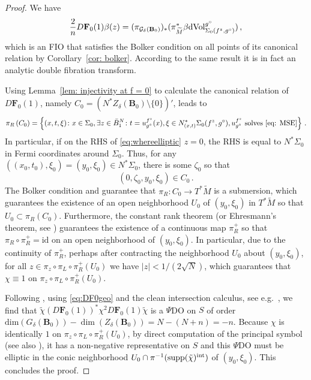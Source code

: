 \documentclass[11pt]{amsart}
\theoremstyle{definition}
\numberwithin{equation}{section}
\newcommand{\abs}[1]{\lvert #1 \rvert}          %
\newcommand{\supp}{\mathrm{supp}}
\newcommand{\BB}{\mathbf B}
\begin{document}
\begin{proof}
	We have
	\begin{equation}\label{eq:DF0geo}
		\frac{2}{n} D\mathbf{F}_0(1)\beta(z) = (\pi_{\mathcal{G}_\delta(\BB_0)})_\ast(\pi_{\widetilde{M}}^\ast \beta {\rm d Vol}_{\Sigma_0(f^z,g^\circ)}^{g^\circ})\,,
	\end{equation}
	which is an FIO that satisfies the Bolker condition on all points of its canonical relation by Corollary~\ref{cor: bolker}. According to the same result it is in fact an analytic double fibration transform.

	Using Lemma~\ref{lem: injectivity at f = 0} to calculate the canonical relation of $D\mathbf{F}_0(1)$, namely $C_0 = (N^\ast Z_\delta(\BB_0)\setminus\{0\})'$, leads to 
	\begin{equation}\label{eq:whereelliptic}
		\pi_R \left(C_0\right) = \left\{(x,t,\xi) \colon x\in{\Sigma}_0,  \exists z \in \bar{B}_1^{N}\colon t=u_{g^\circ}^{f^z}(x), \xi \in N^\ast_{(x,t)}\Sigma_0(f^z,g^\circ), u_{g^\circ}^{f^z}\ \text{solves}\ \eqref{eq: MSE} \right\}\,.
	\end{equation}
	In particular, if on the RHS of \eqref{eq:whereelliptic} $z=0$, the RHS is equal to $N^\ast \Sigma_0$ in Fermi coordinates around $\Sigma_0$. Thus, for any $((x_0,t_0),\xi_0)= (y_0,\xi_0) \in N^\ast \Sigma_0$, there is some $\zeta_0$ so that 
	\[
		(0,\zeta_0,y_0,\xi_0) \in C_0\,.
	\]
	The Bolker condition and \cite[Lem.~4.3]{zbMATH01860565} guarantee that $\pi_R \colon C_0 \to T^\ast \widetilde{M}$ is a submersion, which guarantees the existence of an open neighborhood $U_0$ of $(y_0,\xi_0)$ in $T^\ast \widetilde{M}$ so that $U_0 \subset \pi_R\left( C_0\right)$.
	Furthermore, the constant rank theorem (or Ehresmann's theorem, see \cite[Lem.~9.2]{zbMATH00205892}) guarantees the existence of a continuous map $\pi_R^+$ so that $\pi_R \circ \pi_R^+  = \mathrm{id}$ on an open neighborhood of $(y_0,\xi_0)$. In particular, due to the continuity of $\pi_R^+$, perhaps after contracting the neighborhood $U_0$ about $(y_0,\xi_0)$, for all $z\in \pi_z\circ \pi_L\circ\pi_R^+(U_0)$ we have $\abs{z} <1/(2\sqrt{N})$, which guarantees that $\chi \equiv 1$ on $\pi_z\circ \pi_L\circ\pi_R^+(U_0)$. 

 Following \cite{MR812288}, using \eqref{eq:DF0geo} and the clean intersection calculus, see e.g.\ \cite[Thm.~25.2.3]{zbMATH05528184}, we find that $\tilde{\chi}(D\mathbf{F}_0(1))^\ast \chi^2 D\mathbf{F}_0(1)\tilde{\chi}$ is a $\Psi$DO on $S$ of order $\mathrm{dim}(G_\delta(\BB_0)) - \dim(Z_\delta(\BB_0)) = N - (N+n) = -n$. Because $\chi$ is identically $1$ on $\pi_z\circ\pi_L \circ \pi_R^+(U_0)$, by direct computation of the principal symbol (see also \cite[Cor.~B.4.9]{plamenGunther}), it has a non-negative representative on $S$ and %
    this $\Psi$DO must be elliptic in the conic neighborhood $U_0 \cap \pi^{-1}(\supp(\tilde{\chi})^{\rm int})$ of $(y_0, \xi_0)$. This concludes the proof.
\end{proof}
\end{document}
